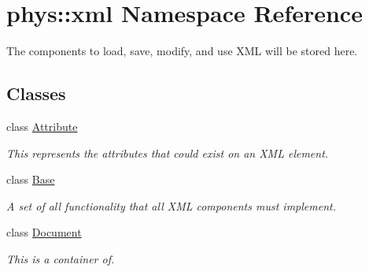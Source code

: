\hypertarget{namespacephys_1_1xml}{
\section{phys::xml Namespace Reference}
\label{d9/d27/namespacephys_1_1xml}
}


The components to load, save, modify, and use XML will be stored here.  


\subsection*{Classes}
\begin{DoxyCompactItemize}
\item 
class \hyperlink{classphys_1_1xml_1_1Attribute}{Attribute}
\begin{DoxyCompactList}\small\item\em This represents the attributes that could exist on an XML element. \item\end{DoxyCompactList}\item 
class \hyperlink{classphys_1_1xml_1_1Base}{Base}
\begin{DoxyCompactList}\small\item\em A set of all functionality that all XML components must implement. \item\end{DoxyCompactList}\item 
class \hyperlink{classphys_1_1xml_1_1Document}{Document}
\begin{DoxyCompactList}\small\item\em This is a container of. \item\end{DoxyCompactList}\end{DoxyCompactItemize}


